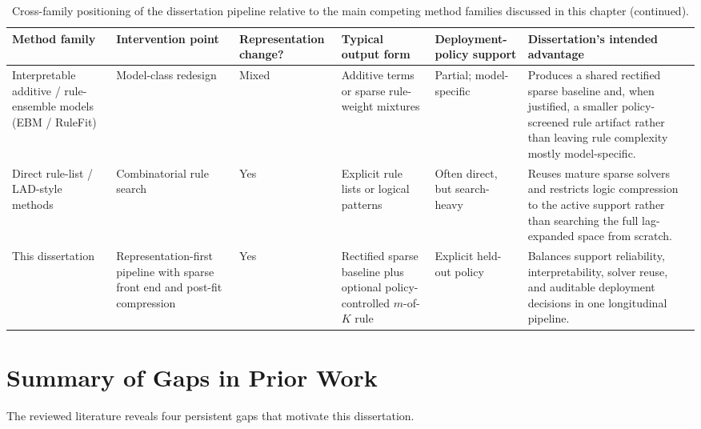 \begin{table}[p]
    \ContinuedFloat
    \caption[]{Cross-family positioning of the dissertation pipeline relative to the main competing method families discussed in this chapter (continued).}
    \centering
    \setlength{\tabcolsep}{2pt}
    \renewcommand{\arraystretch}{0.95}
    \begin{tabularx}{0.98\textwidth}{>{\RaggedRight\arraybackslash}p{}>{\RaggedRight\arraybackslash}p{}>{\RaggedRight\arraybackslash}p{}>{\RaggedRight\arraybackslash}p{}>{\RaggedRight\arraybackslash}p{}>{\RaggedRight\arraybackslash}X}
        Method family & Intervention point & Representation change? & Typical output form & Deployment-policy support & Dissertation's intended advantage \\ \hline
        Interpretable additive / rule-ensemble models (EBM / RuleFit) & Model-class redesign & Mixed & Additive terms or sparse rule-weight mixtures & Partial; model-specific & Produces a shared rectified sparse baseline and, when justified, a smaller policy-screened rule artifact rather than leaving rule complexity mostly model-specific. \\ \hline
        Direct rule-list / LAD-style methods & Combinatorial rule search & Yes & Explicit rule lists or logical patterns & Often direct, but search-heavy & Reuses mature sparse solvers and restricts logic compression to the active support rather than searching the full lag-expanded space from scratch. \\ \hline
        This dissertation & Representation-first pipeline with sparse front end and post-fit compression & Yes & Rectified sparse baseline plus optional policy-controlled $m$-of-$K$ rule & Explicit held-out policy & Balances support reliability, interpretability, solver reuse, and auditable deployment decisions in one longitudinal pipeline. \\ \hline
    \end{tabularx}
\end{table}

\section{Summary of Gaps in Prior Work}

The reviewed literature reveals four persistent gaps that motivate this dissertation.

